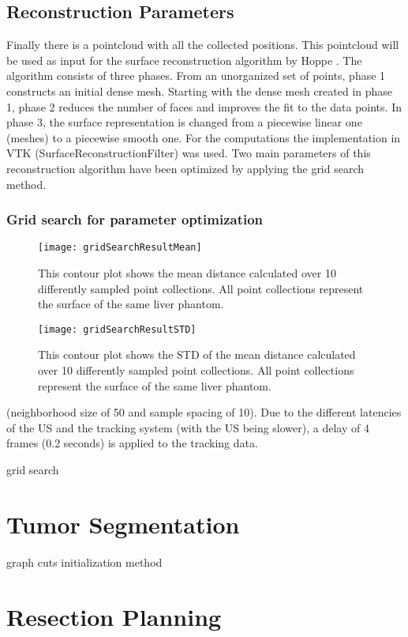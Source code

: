 \subsection{Reconstruction Parameters}
Finally there is a pointcloud with all the collected positions. This pointcloud
will be used as input for the surface reconstruction algorithm by Hoppe
\cite{hoppe1992surface}. The algorithm consists
of three phases. From an unorganized set of points, phase 1 constructs an
initial dense mesh. Starting with the dense mesh created in phase 1, phase 2
reduces the number of faces and improves the fit to the data points. In phase 3,
the surface representation is changed from a piecewise linear one (meshes) to a
piecewise smooth one. For the computations the implementation in VTK
(SurfaceReconstructionFilter) was used. Two main parameters of this
reconstruction algorithm have been optimized by applying the grid search method.
\subsubsection{Grid search for parameter optimization}

\begin{figure}[H]
  \centering
 \texttt{[image: gridSearchResultMean]}
  \caption{This contour plot shows the mean distance calculated over 10
    differently sampled point collections. All point collections represent the
    surface of the same liver phantom.}
  \label{fig:gridSearchResultMean}
\end{figure}

\begin{figure}[H]
  \centering
 \texttt{[image: gridSearchResultSTD]}
  \caption{This contour plot shows the STD of the mean distance calculated over 10
    differently sampled point collections. All point collections represent the
    surface of the same liver phantom.}
  \label{fig:gridSearchResultSTD}
\end{figure}

(neighborhood size of 50 and sample
spacing of 10). Due to the different latencies of the US and the tracking system
(with the US being slower), a delay of 4 frames (0.2 seconds) is applied to the
tracking data.


grid search
\section{Tumor Segmentation}
graph cuts
initialization method
\section{Resection Planning}
